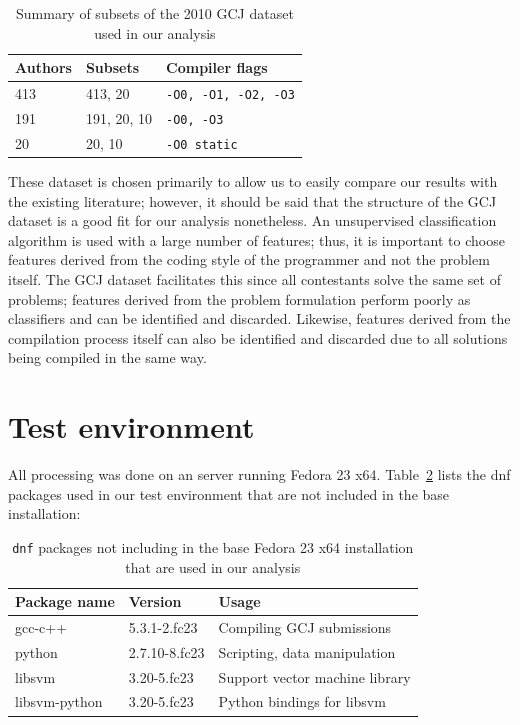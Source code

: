 \documentclass[a4paper,11pt]{kth-mag}
\begin{document}
\begin{table}[!htb]
    \centering
        \begin{tabular}{ l l l }
        Authors & Subsets & Compiler flags \\ \hline
        413 & 413, 20 &  \lstinline{-O0, -O1, -O2, -O3} \\ 
        191 & 191, 20, 10 &  \lstinline{-O0, -O3} \\ 
        20 & 20, 10 &  \lstinline{-O0 static} 
        \end{tabular}
    \caption{Summary of subsets of the 2010 GCJ dataset used in our analysis}
    \label{tab:datasets-summary}
\end{table}

These dataset is chosen primarily to allow us to easily compare our results
with the existing literature; however, it should be said that the structure of
the GCJ dataset is a good fit for our analysis nonetheless. An
unsupervised classification algorithm is used with a large number of features; thus, it is
important to choose features derived from the coding style of the programmer
and not the problem itself. The GCJ dataset facilitates this since all
contestants solve the same set of problems; features derived from the problem
formulation perform poorly as classifiers and can be identified and discarded.
Likewise, features derived from the compilation process itself can also be
identified and discarded due to all solutions being compiled in the same way.

\section{Test environment}
All processing was done on an server running Fedora 23 x64.
Table~\ref{tab:dnf-packages} lists the dnf packages used in our test
environment that are not included in the base installation:

\begin{table}[!htb]
    \centering
        \begin{tabular}{ l l l }
        Package name & Version & Usage \\ \hline
        gcc-c++ & 5.3.1-2.fc23 & Compiling GCJ submissions \\
        python & 2.7.10-8.fc23 & Scripting, data manipulation \\
        libsvm & 3.20-5.fc23  & Support vector machine library \\
        libsvm-python & 3.20-5.fc23 & Python bindings for libsvm
        \end{tabular}
    \caption{\lstinline{dnf} packages not including in the base Fedora 23 x64
    installation that are used in our analysis}
    \label{tab:dnf-packages}
\end{table}
\end{document}
